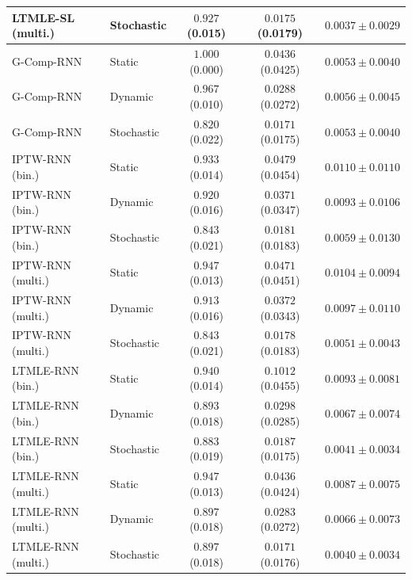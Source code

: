 \begin{table}[ht]
{\begin{tabular}{ll|c|c|c}
LTMLE-SL (multi.) & Stochastic & $0.927$ (0.015) & $0.0175$ (0.0179) & $0.0037 \pm 0.0029$ \\ 
\hline
G-Comp-RNN & Static & $1.000$ (0.000) & $0.0436$ (0.0425) & $0.0053 \pm 0.0040$ \\ 
G-Comp-RNN & Dynamic & $0.967$ (0.010) & $0.0288$ (0.0272) & $0.0056 \pm 0.0045$ \\ 
G-Comp-RNN & Stochastic & $0.820$ (0.022) & $0.0171$ (0.0175) & $0.0053 \pm 0.0040$ \\ 
IPTW-RNN (bin.) & Static & $0.933$ (0.014) & $0.0479$ (0.0454) & $0.0110 \pm 0.0110$ \\ 
IPTW-RNN (bin.) & Dynamic & $0.920$ (0.016) & $0.0371$ (0.0347) & $0.0093 \pm 0.0106$ \\ 
IPTW-RNN (bin.) & Stochastic & $0.843$ (0.021) & $0.0181$ (0.0183) & $0.0059 \pm 0.0130$ \\ 
IPTW-RNN (multi.) & Static & $0.947$ (0.013) & $0.0471$ (0.0451) & $0.0104 \pm 0.0094$ \\ 
IPTW-RNN (multi.) & Dynamic & $0.913$ (0.016) & $0.0372$ (0.0343) & $0.0097 \pm 0.0110$ \\ 
IPTW-RNN (multi.) & Stochastic & $0.843$ (0.021) & $0.0178$ (0.0183) & $0.0051 \pm 0.0043$ \\ 
LTMLE-RNN (bin.) & Static & $0.940$ (0.014) & $0.1012$ (0.0455) & $0.0093 \pm 0.0081$ \\ 
LTMLE-RNN (bin.) & Dynamic & $0.893$ (0.018) & $0.0298$ (0.0285) & $0.0067 \pm 0.0074$ \\ 
LTMLE-RNN (bin.) & Stochastic & $0.883$ (0.019) & $0.0187$ (0.0175) & $0.0041 \pm 0.0034$ \\ 
LTMLE-RNN (multi.) & Static & $0.947$ (0.013) & $0.0436$ (0.0424) & $0.0087 \pm 0.0075$ \\ 
LTMLE-RNN (multi.) & Dynamic & $0.897$ (0.018) & $0.0283$ (0.0272) & $0.0066 \pm 0.0073$ \\ 
LTMLE-RNN (multi.) & Stochastic & $0.897$ (0.018) & $0.0171$ (0.0176) & $0.0040 \pm 0.0034$ \\ 
\hline
\end{tabular}
}
\end{table}

